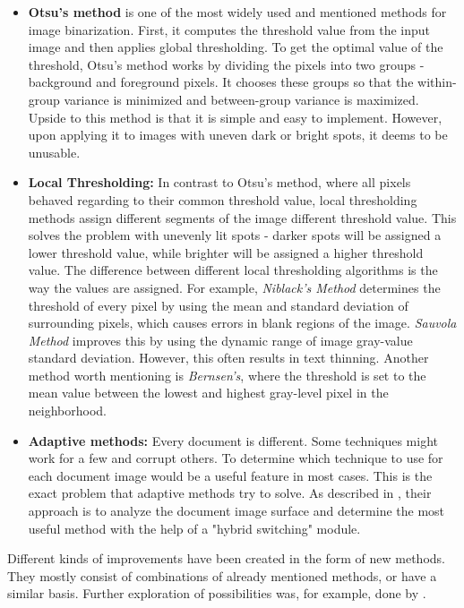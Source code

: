\begin{itemize}
\item\textbf{Otsu's method} \citep{otsu} is one of the most widely used and mentioned methods for image binarization. First, it computes the threshold value from the input image and then applies global thresholding. To get the optimal value of the threshold, Otsu's method works by dividing the pixels into two groups - background and foreground pixels. It chooses these groups so that the within-group variance is minimized and between-group variance is maximized. Upside to this method is that it is simple and easy to implement. However, upon applying it to images with uneven dark or bright spots, it deems to be unusable.

\item\textbf{Local Thresholding: }\citep{localOtherBin} In contrast to Otsu's method, where all pixels behaved regarding to their common threshold value, local thresholding methods assign different segments of the image different threshold value. This solves the problem with unevenly lit spots - darker spots will be assigned a lower threshold value, while brighter will be assigned a higher threshold value. The difference between different local thresholding algorithms is the way the values are assigned. For example, \emph{Niblack's Method} determines the threshold of every pixel by using the mean and standard deviation of surrounding pixels, which causes errors in blank regions of the image. \emph{Sauvola Method} improves this by using the dynamic range of image gray-value standard deviation. However, this often results in text thinning. Another method worth mentioning is \emph{Bernsen's}, where the threshold is set to the mean value between the lowest and highest gray-level pixel in the neighborhood.

\item\textbf{Adaptive methods: } Every document is different. Some techniques might work for a few and corrupt others. To determine which technique to use for each document image would be a useful feature in most cases. This is the exact problem that adaptive methods try to solve. As described in \citep{adaptiveBin}, their approach is to analyze the document image surface and determine the most useful method with the help of a "hybrid switching" module.

\end{itemize}

Different kinds of improvements have been created in the form of new methods. They mostly consist of combinations of already mentioned methods, or have a similar basis. Further exploration of possibilities was, for example, done by \citet{localOtherBin}.

